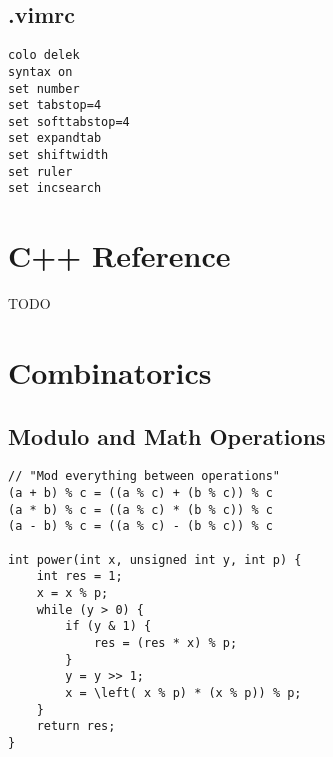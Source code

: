 \documentclass{article}
\begin{document}
\subsection{.vimrc}
\begin{lstlisting}
colo delek
syntax on
set number
set tabstop=4
set softtabstop=4
set expandtab
set shiftwidth
set ruler
set incsearch
\end{lstlisting}
\section{C++ Reference}
TODO
\section{Combinatorics}
\subsection{Modulo and Math Operations}
\begin{lstlisting}
// "Mod everything between operations"
(a + b) % c = ((a % c) + (b % c)) % c
(a * b) % c = ((a % c) * (b % c)) % c
(a - b) % c = ((a % c) - (b % c)) % c

int power(int x, unsigned int y, int p) {
    int res = 1;
    x = x % p;
    while (y > 0) {
        if (y & 1) {
            res = (res * x) % p;
        }
        y = y >> 1;
        x = \left( x % p) * (x % p)) % p;
    }
    return res;
}
\end{lstlisting}
\end{document}
